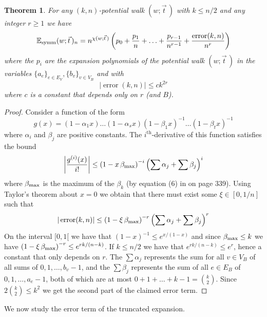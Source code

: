 \documentclass{memo-l}
\theoremstyle{plain}
\theoremstyle{definition}
\numberwithin{section}{chapter}
\numberwithin{equation}{chapter}
\DeclareMathOperator{\error}{error}
\newcommand{\potwalk}{(w;\vec t\,)}
\theoremstyle{plain}
\newtheorem{thm}[theorem]{Theorem}
\theoremstyle{definition}
\newcommand\EE{\mathbb{E}}
\begin{document}
\begin{thm}\label{thm:Esymm_expansion} For any $(k,n)$-potential walk
\( \potwalk \) with \( k \leq n/2\) and any integer \( r \geq 1 \) we have
\begin{equation}\label{eq:Esymm_expansion} 
\EE_{\rm{symm}}\potwalk_n =
n^{\chi\potwalk} \left( p_0 + \frac{p_1}{n} + \ldots +
\frac{p_{r-1}}{n^{r-1}} + \frac{\error(k,n)}{n^r} \right)  
\end{equation}
where the \( p_i \) are the expansion polynomials of the potential walk \(
\potwalk \) in the variables \( \{ a_e\}_{e \in E_V}, \{b_v\}_{v \in V_B}
\) and with 
\begin{equation}
\label{eq:Esymm_expansion_error}
 | \error(k,n) | \leq ck^{2r} 
\end{equation}
where \(c\) is a constant
that depends only on \(r\) (and $B$).  
\end{thm} 
\begin{proof} Consider a function of
the form \[ g(x) = (1-\alpha_1 x) \ldots (1- \alpha_s x) (1- \beta_1
x)^{-1} \ldots (1-\beta_t x)^{-1} \] where \( \alpha_i \) and \( \beta_j \)
are positive constants. The \(i^{\text{th}}\)-derivative of this function
satisfies the bound \[ \left| \frac{g^{(i)}(x)}{i!} \right| \leq \left( 1-x
\, \beta_{\rm{max}} \right)^{-i} \left( \sum \alpha_j + \sum \beta_j
\right)^i \] where \( \beta_{\rm{max}} \) is the maximum of the \( \beta_k
\) (by equation (6) in \cite{friedman_random_graphs} on page 339). Using
Taylor's theorem about \( x = 0 \) we obtain that there must exist some \(
\xi \in [0, 1/n] \) such that \[ | \error(k,n) | \leq \left( 1-\xi \,
\beta_{\rm{max}} \right)^{-r} \left( \sum \alpha_j + \sum \beta_j \right)^r
\] On the interval \( [0,1[ \) we have that \( (1-x)^{-1} \leq e^{x/(1-x)}
\) and since \( \beta_{\rm{max}} \leq k \) we have \( \left( 1-\xi \,
\beta_{\rm{max}} \right)^{-r} \leq e^{rk/(n-k)} \). If \(k \leq n/2\) we
have that \( e^{rk/(n-k)} \leq e^r \), hence a constant that only depends
on \(r\). The \( \sum \alpha_j \) represents the sum for all \(v \in V_B\)
of all sums of \( 0, 1, \ldots, b_v-1\), and the \( \sum \beta_j \)
represents the sum of all \( e \in E_B \) of \( 0, 1, \ldots, a_e-1 \),
both of which are at most \( 0 + 1 + \ldots + k-1 = \binom{k}{2} \). Since
\( 2 \binom{k}{2} \leq k^2 \) we get the second part of the claimed error
term.  \end{proof}

We now study the error term of the truncated expansion.
\end{document}
